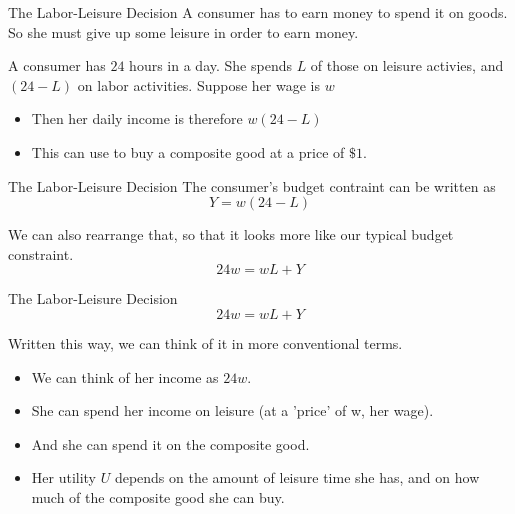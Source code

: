 \documentclass{beamer}
\begin{document}
\begin{frame}{The Labor-Leisure Decision}
  A consumer has to earn money to spend it on goods. So she must give up some leisure in order to earn money.

  \bigskip
  A consumer has $24$ hours in a day. She spends $L$ of those on leisure activies, and $(24 - L)$ on labor activities. Suppose her wage is $w$
  
  \bigskip
  \begin{itemize}
    \item Then her daily income is therefore $w(24-L)$ 

    \item This can use to buy a composite good at a price of $\$1$.
  \end{itemize}
\end{frame}

\begin{frame}{The Labor-Leisure Decision}
  The consumer's budget contraint can be written as
  $$
    Y = w (24 - L)
  $$

  \bigskip
  We can also rearrange that, so that it looks more like our typical budget constraint.
  $$
    24w = wL + Y
  $$
\end{frame}

\begin{frame}{The Labor-Leisure Decision}
  $$
    24w = wL + Y
  $$

  Written this way, we can think of it in more conventional terms.
  \bigskip
  \begin{itemize}
    \item We can think of her income as $24w$.

    \item She can spend her income on leisure (at a 'price' of w, her wage).

    \item And she can spend it on the composite good.

    \item Her utility $U$ depends on the amount of leisure time she has, and on how much of the composite good she can buy.
  \end{itemize}
\end{frame}
\end{document}
